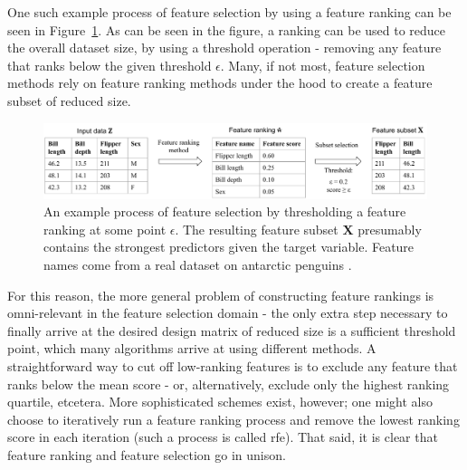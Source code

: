 \documentclass[../main.tex]{subfiles}
\begin{document}
One such example process of feature selection by using a feature ranking can be seen in Figure~\ref{fig:schematic-feature-selection}. As can be seen in the figure, a ranking can be used to reduce the overall dataset size, by using a threshold operation - removing any feature that ranks below the given threshold $\epsilon$. Many, if not most, feature selection methods rely on feature ranking methods under the hood to create a feature subset of reduced size.

\begin{figure}[h]
    \centering
    \includegraphics[width=\linewidth]{report/images/schematic-feature-selection.pdf}
    \caption{An example process of feature selection by thresholding a feature ranking at some point $\epsilon$. The resulting feature subset $\mathbf{X}$ presumably contains the strongest predictors given the target variable. Feature names come from a real dataset on antarctic penguins \citep{horst_palmerpenguins_2020}.}
    \label{fig:schematic-feature-selection}
\end{figure}

For this reason, the more general problem of constructing feature rankings is omni-relevant in the feature selection domain - the only extra step necessary to finally arrive at the desired design matrix of reduced size is a sufficient threshold point, which many algorithms arrive at using different methods. A straightforward way to cut off low-ranking features is to exclude any feature that ranks below the mean score - or, alternatively, exclude only the highest ranking quartile, etcetera. More sophisticated schemes exist, however; one might also choose to iteratively run a feature ranking process and remove the lowest ranking score in each iteration (such a process is called \gls{rfe}). That said, it is clear that feature ranking and feature selection go in unison.





\end{document}
